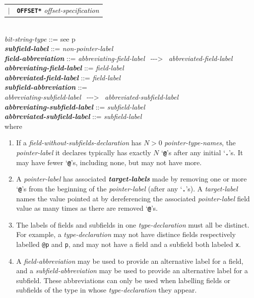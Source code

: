 \documentclass[12pt]{article}
\newcommand{\TT}[1]{{\tt \bfseries #1}}
\newcommand{\ABV}{-{}-{}->}
\newcommand{\ttkey}[1]{{\tt \bfseries #1}}
\newcommand{\emkey}[1]{{\em \bfseries #1}}
\newcommand{\emskey}[2]{{\em \bfseries #1#2}}
\newcommand{\pagref}[1]{p\pageref{#1}}
\newenvironment{indpar}[1][0.3in]%
	{\begin{list}{}%
		     {\setlength{\itemsep}{0in}%
		      \setlength{\topsep}{0in}%
		      \setlength{\parsep}{1ex}%
		      \setlength{\labelwidth}{#1}%
		      \setlength{\leftmargin}{#1}%
		      \addtolength{\leftmargin}{\labelsep}}%
	 \item}%
	{\end{list}}
\begin{document}
\begin{indpar}
\begin{tabular}[t]{rl}
    $|$ &  \ttkey{*OFFSET*} {\em offset-specification}
    \end{tabular} \\
{\em bit-string-type} ::= see \pagref{BIT-STRING-TYPE} \\
\emkey{subfield-label}\label{SUBFIELD-LABEL} ::=  {\em non-pointer-label}
\\[2ex]
\emkey{field-abbreviation}\label{FIELD-ABBREVIATION} ::=
    {\em abbreviating-field-label}~ \ABV{}~ {\em abbreviated-field-label} \\
\emkey{abbreviating-field-label} ::= {\em field-label} \\
\emkey{abbreviated-field-label} ::= {\em field-label} \\
\emkey{subfield-abbreviation}\label{SUBFIELD-ABBREVIATION} ::= \\
\hspace*{0.5in}
    {\em abbreviating-subfield-label}~ \ABV{}~ {\em abbreviated-subfield-label} \\
\emkey{abbreviating-subfield-label} ::= {\em subfield-label} \\
\emkey{abbreviated-subfield-label} ::= {\em subfield-label}
\\[2ex]
where
\begin{enumerate}
\item If a {\em field-without-subfields-declaration}
has $N>0$ {\em pointer-type-names}, the {\em pointer-label}
it declares typically has exactly $N$ `\TT{@}'s after
any initial `\TT{.}'s.
It may have fewer `\TT{@}'s, including none, but may not have more.
\item
A {\em pointer-label} has associated \emskey{target-label}s
made by removing one or more `\TT{@}'s from the beginning of the
{\em pointer-label} (after any `\TT{.}'s).  A {\em target-label}
names the value pointed at by dereferencing the associated
{\em pointer-label} field value as many times as there are removed
`\TT{@}'s.
\item
The labels of fields and subfields in one {\em type-declaration}
must all be distinct.  For example, a {\em type-declaration}
may not have distince fields respectively labelled {\tt @p} and {\tt p},
and may not have a field and a subfield both labeled {\tt x}.
\item
A {\em field-abbreviation} may be used to provide an alternative
label for a field, and a
{\em subfield-abbreviation} may be used to provide an alternative
label for a subfield.  These abbreviations can only be used when
labelling fields or subfields of the type in whose {\em type-declaration}
they appear.
\end{enumerate}
\end{indpar}
\end{document}

